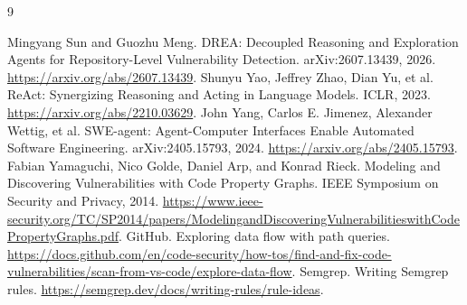 \documentclass[UTF8,a4paper,11pt,fontset=fandol]{ctexart}
\begin{document}
\begin{thebibliography}{9}
\raggedright
{} Mingyang Sun and Guozhu Meng. DREA: Decoupled Reasoning and Exploration Agents for Repository-Level Vulnerability Detection. arXiv:2607.13439, 2026. \url{https://arxiv.org/abs/2607.13439}.
 Shunyu Yao, Jeffrey Zhao, Dian Yu, et al. ReAct: Synergizing Reasoning and Acting in Language Models. ICLR, 2023. \url{https://arxiv.org/abs/2210.03629}.
 John Yang, Carlos E. Jimenez, Alexander Wettig, et al. SWE-agent: Agent-Computer Interfaces Enable Automated Software Engineering. arXiv:2405.15793, 2024. \url{https://arxiv.org/abs/2405.15793}.
 Fabian Yamaguchi, Nico Golde, Daniel Arp, and Konrad Rieck. Modeling and Discovering Vulnerabilities with Code Property Graphs. IEEE Symposium on Security and Privacy, 2014. \url{https://www.ieee-security.org/TC/SP2014/papers/ModelingandDiscoveringVulnerabilitieswithCodePropertyGraphs.pdf}.
 GitHub. Exploring data flow with path queries. \url{https://docs.github.com/en/code-security/how-tos/find-and-fix-code-vulnerabilities/scan-from-vs-code/explore-data-flow}.
 Semgrep. Writing Semgrep rules. \url{https://semgrep.dev/docs/writing-rules/rule-ideas}.
\end{thebibliography}
\end{document}
